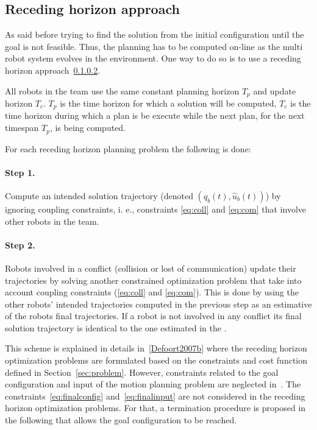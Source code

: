 \documentclass[eprint]{actapoly}
\begin{document}
\subsection{Receding horizon approach}


As said before trying to find the solution from the initial configuration
until the goal is not feasible. Thus, the planning has to be computed on-line
as the multi robot system evolves in the environment.
One way to do so is to use a receding horizon approach~\ref{}.


All robots in the team use the same constant planning horizon $T_p$ and update
horizon $T_c$. $T_p$ is the time horizon for which a solution will be computed,
$T_c$ is the time horizon during which a plan is be execute while the
next plan, for the next timespan $T_p$, is being computed.


For each receding horizon planning problem the following is done:
\paragraph{Step 1.}\label{step1} Compute an intended solution trajectory (denoted $(\hat{q}_b(t), \hat{u}_b(t))$)
by ignoring coupling
constraints, i. e., constraints \ref{eq:coll} and \ref{eq:com} that involve other
robots in the team.
\paragraph{Step 2.} Robots involved in a conflict (collision or lost of communication)
update their trajectories
by solving another constrained optimization problem that take into account
coupling constraints (\ref{eq:coll} and \ref{eq:com}).
This is done by using the other robots' intended
trajectories computed in the previous step as an estimative of the robots
final trajectories. If a robot is not involved in any conflict its final
solution trajectory is identical to the one estimated in the .

\mbox{}

This scheme is explained in details in~\ref{Defoort2007b} where the receding horizon optimization
problems are formulated based on the constraints and cost function defined in Section~\ref{sec:problem}.
However, constraints related to the goal configuration and input of the motion planning problem are
neglected in~\cite{Defoort2007b}.
The constraints~\ref{eq:finalconfig} and~\ref{eq:finalinput} are not considered
in the receding horizon optimization problems.
For that, a termination procedure is proposed in the following that allows the goal configuration
to be reached.
\end{document}
